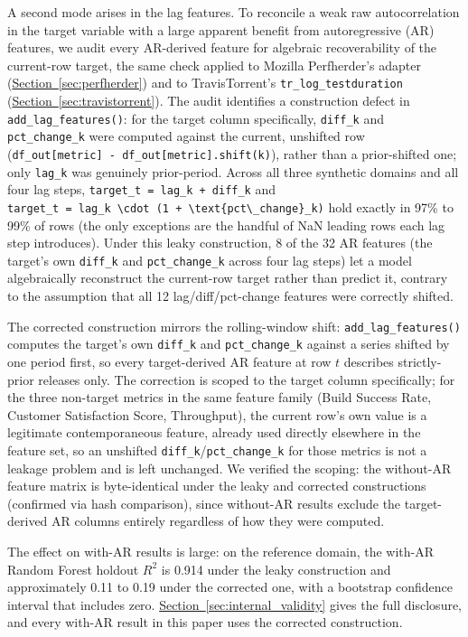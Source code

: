 \documentclass[technologies,article,submit,pdftex,moreauthors]{Definitions/mdpi}
\begin{document}
A second mode arises in the lag features. To reconcile a weak raw autocorrelation in the target variable with a large apparent benefit from autoregressive (AR) features, we audit every AR-derived feature for algebraic recoverability of the current-row target, the same check applied to Mozilla Perfherder's adapter (\hyperref[sec:perfherder]{Section~\ref*{sec:perfherder}}) and to TravisTorrent's \texttt{tr\_log\_testduration} (\hyperref[sec:travistorrent]{Section~\ref*{sec:travistorrent}}). The audit identifies a construction defect in \texttt{add\_lag\_features()}: for the target column specifically, \texttt{diff\_k} and \texttt{pct\_change\_k} were computed against the current, unshifted row (\texttt{df\_out{[}metric{]}\ -\ df\_out{[}metric{]}.shift(k)}), rather than a prior-shifted one; only \texttt{lag\_k} was genuinely prior-period. Across all three synthetic domains and all four lag steps, \texttt{target\_t\ =\ lag\_k\ +\ diff\_k} and \texttt{target\_t\ =\ lag\_k\ \textbackslash{}cdot\ (1\ +\ \textbackslash{}text\{pct\textbackslash{}\_change\}\_k)} hold exactly in 97\% to 99\% of rows (the only exceptions are the handful of NaN leading rows each lag step introduces). Under this leaky construction, 8 of the 32 AR features (the target's own \texttt{diff\_k} and \texttt{pct\_change\_k} across four lag steps) let a model algebraically reconstruct the current-row target rather than predict it, contrary to the assumption that all 12 lag/diff/pct-change features were correctly shifted.

The corrected construction mirrors the rolling-window shift: \texttt{add\_lag\_features()} computes the target's own \texttt{diff\_k} and \texttt{pct\_change\_k} against a series shifted by one period first, so every target-derived AR feature at row \(t\) describes strictly-prior releases only. The correction is scoped to the target column specifically; for the three non-target metrics in the same feature family (Build Success Rate, Customer Satisfaction Score, Throughput), the current row's own value is a legitimate contemporaneous feature, already used directly elsewhere in the feature set, so an unshifted \texttt{diff\_k}/\texttt{pct\_change\_k} for those metrics is not a leakage problem and is left unchanged. We verified the scoping: the without-AR feature matrix is byte-identical under the leaky and corrected constructions (confirmed via hash comparison), since without-AR results exclude the target-derived AR columns entirely regardless of how they were computed.

The effect on with-AR results is large: on the reference domain, the with-AR Random Forest holdout \(R^2\) is 0.914 under the leaky construction and approximately 0.11 to 0.19 under the corrected one, with a bootstrap confidence interval that includes zero. \hyperref[sec:internal_validity]{Section~\ref*{sec:internal_validity}} gives the full disclosure, and every with-AR result in this paper uses the corrected construction.
\end{document}
